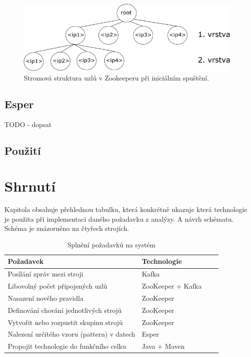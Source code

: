 \documentclass[
  digital, %
  table,   %
  nolof,     %
  nolot,     %
  oneside, %
  nocover,
  monochrome,
  12pt
]{fithesis3}
\begin{document}
\begin{figure}[H]
	\centering
    \includegraphics[width=1\textwidth, height=0.22\textheight]{images/zookeeper-impl.png}
    \caption{Stromová struktura uzlů v Zookeeperu při iniciálním spuštění.}
    \label{fig:zookeeper-impl}
\end{figure}

\subsection{Esper}
\label{sec:esper}
TODO - dopsat

\subsection*{Použití}

\section{Shrnutí}
Kapitola obsahuje přehlednou tabulku, která konkrétně ukazuje která technologie je použita při implementaci daného požadavku z analýzy. A návrh schématu. Schéma je znázorněno na čtyřech strojích.

\begin{table}[H]
  \centering
  \begin{tabularx}{\textwidth}{lllX}
    \toprule
    Požadavek & Technologie \\
    \midrule
    Posílání zpráv mezi stroji & Kafka \\
    Libovolný počet připojených uzlů & ZooKeeper + Kafka \\
    Nasazení nového pravidla & ZooKeeper \\
    Definování chování jednotlivých strojů & ZooKeeper \\
    Vytvořit nebo rozpustit skupinu strojů & ZooKeeper \\
    Nalezení určitého vzoru (pattern) v datech & Esper \\
    Propojit technologie do funkčního celku & Java + Maven \\
    \bottomrule
  \end{tabularx}
  \caption{Splnění požadavků na systém}
  \label{tab:fulfill-usecases}
\end{table}
\end{document}
